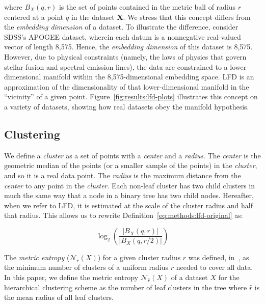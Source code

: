where $B_X(q, r)$ is the set of points contained in the metric ball of radius $r$ centered at a point $q$ in the dataset $\textbf{X}$.
We stress that this concept differs from the \emph{embedding dimension} of a dataset.
To illustrate the difference, consider SDSS's APOGEE dataset, wherein each datum is a nonnegative real-valued vector of length 8,575.
Hence, the \emph{embedding dimension} of this dataset is 8,575. 
However, due to physical constraints (namely, the laws of physics that govern stellar fusion and spectral emission lines), the data are constrained to a lower-dimensional manifold within the 8,575-dimensional embedding space.
LFD is an approximation of the dimensionality of that lower-dimensional manifold in the ``vicinity'' of a given point.
Figure~\ref{fig:results:lfd-plots} illustrates this concept on a variety of datasets, showing how real datasets obey the manifold hypothesis.


\subsection{Clustering}
\label{subsec:methods:clustering}

We define a \emph{cluster} as a set of points with a \emph{center} and a \emph{radius}.
The \emph{center} is the geometric median of the points (or a smaller sample of the points) in the \emph{cluster}, and so it is a real data point.
The \emph{radius} is the maximum distance from the \emph{center} to any point in the \emph{cluster}.
Each non-leaf cluster has two child clusters in much the same way that a node in a binary tree has two child nodes.
Hereafter, when we refer to LFD, it is estimated at the scale of the cluster radius and half that radius. 
This allows us to rewrite Definition~\ref{eq:methods:lfd-original} as:

\begin{equation} 
    \log_2 \left( \frac{|B_X(q, r)|}{|B_X(q, r/2)|} \right)
    \label{eq:methods:lfd-simplified}
\end{equation}

The \emph{metric entropy} ($\mathcal{N}_{r}(X)$) for a given cluster radius $r$ was defined, in~\cite{yu2015entropy}, as the minimum number of clusters of a uniform radius $r$ needed to cover all data.
In this paper, we define the metric entropy $\mathcal{N}_{\hat{r}}(X)$ of a dataset $X$ for the hierarchical clustering scheme as the number of leaf clusters in the tree where $\hat{r}$ is the mean radius of all leaf clusters.

